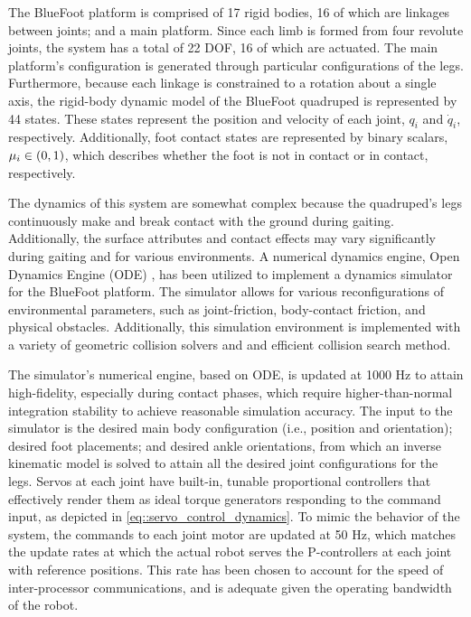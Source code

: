 		The BlueFoot platform is comprised of 17 rigid bodies, 16 of which are linkages between joints; and a main platform. Since each limb is formed from four revolute joints, the system has a total of 22 DOF, 16 of which are actuated. The main platform's configuration is generated through particular configurations of the legs. Furthermore, because each linkage is constrained to a rotation about a single axis, the rigid-body dynamic model of the BlueFoot quadruped is represented by 44 states. These states represent the position and velocity of each joint, $q_{i}$ and $\dot{q}_{i}$, respectively. Additionally, foot contact states are represented by binary scalars, $\mu_{i} \in \left(0,1\right)$, which describes whether the foot is not in contact or in contact, respectively.

		The dynamics of this system are somewhat complex because the quadruped's legs continuously make and break contact with the ground during gaiting. Additionally, the surface attributes and contact effects may vary significantly during gaiting and for various environments. A numerical dynamics engine, Open Dynamics Engine (ODE) \cite{ODE_Website}, has been utilized to implement a dynamics simulator for the BlueFoot platform. The simulator allows for various reconfigurations of environmental parameters, such as joint-friction, body-contact friction, and physical obstacles. Additionally, this simulation environment is implemented with a variety of geometric collision solvers and and efficient collision search method.

		The simulator's numerical engine, based on ODE, is updated at 1000 Hz to attain high-fidelity, especially during contact phases, which require higher-than-normal integration stability to achieve reasonable  simulation accuracy. The input to the simulator is the desired main body configuration (i.e., position and orientation); desired foot placements; and desired ankle orientations, from which an inverse kinematic model is solved to attain all the desired joint configurations for the legs. Servos at each joint have built-in, tunable proportional controllers that effectively render them as ideal torque generators responding to the command input, as depicted in \ref{eq::servo_control_dynamics}. To mimic the behavior of the system, the commands to each joint motor are updated at 50 Hz, which matches the update rates at which the actual robot serves the P-controllers at each joint with reference positions. This rate has been chosen to account for the speed of inter-processor communications, and is adequate given the operating bandwidth of the robot.
		
